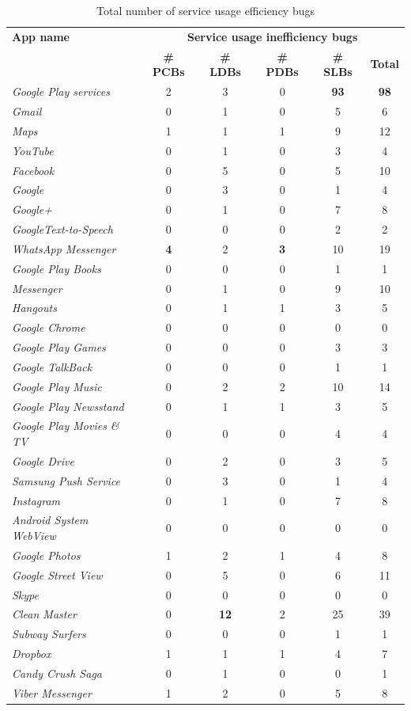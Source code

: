 \documentclass[sigconf,review, anonymous]{acmart}
\begin{document}
\begin{table}
\centering
\footnotesize
\caption{Total number of service usage efficiency bugs}
\begin{tabular}{|l|ccccc|}\hline
{\bf App name}&\multicolumn{5}{|c|}{\textbf{Service usage inefficiency bugs}}\\
& {\bf \# PCBs}&{\bf \# LDBs}&{\bf \# PDBs} &{\bf \# SLBs}&{\bf Total}\\
\hline
\hline
{\it Google Play services}&2&3&0&{\bf 93}&{\bf 98}\\
{\it Gmail}&0&1&0&5&6\\
{\it Maps}&1&1&1&9&12\\
{\it YouTube}&0&1&0&3&4\\
{\it Facebook}&0&5&0&5&10\\
{\it Google}&0&3&0&1&4\\
{\it Google+}&0&1&0&7&8\\
{\it GoogleText-to-Speech}&0&0&0&2&2\\
{\it WhatsApp Messenger}&{\bf 4}&2&{\bf 3}&10&19\\
{\it Google Play Books}&0&0&0&1&1\\
{\it Messenger}&0&1&0&9&10\\
{\it Hangouts}&0&1&1&3&5\\
{\it Google Chrome}&0&0&0&0&0\\
{\it Google Play Games}&0&0&0&3&3\\
{\it Google TalkBack}&0&0&0&1&1\\
{\it Google Play Music}&0&2&2&10&14\\
{\it Google Play Newsstand}&0&1&1&3&5\\
{\it Google Play Movies \& TV}&0&0&0&4&4\\
{\it Google Drive}&0&2&0&3&5\\
{\it Samsung Push Service}&0&3&0&1&4\\
{\it Instagram}&0&1&0&7&8\\
{\it Android System WebView}&0&0&0&0&0\\
{\it Google Photos}&1&2&1&4&8\\
{\it Google Street View}&0&5&0&6&11\\
{\it Skype}&0&0&0&0&0\\
{\it Clean Master}&0&{\bf 12}&2&25&39\\
{\it Subway Surfers}&0&0&0&1&1\\
{\it Dropbox}&1&1&1&4&7\\
{\it Candy Crush Saga}&0&1&0&0&1\\
{\it Viber Messenger}&1&2&0&5&8\\

\end{tabular}
\end{table}
\end{document}

